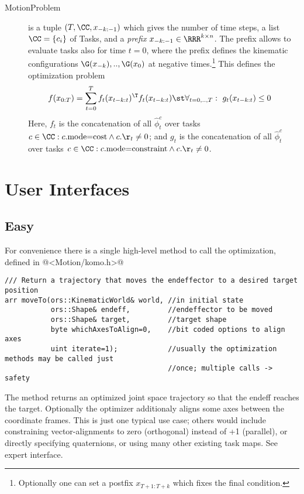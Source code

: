\documentclass[10pt,fleqn,twoside]{article}
\begin{document}
\begin{description}
\item[MotionProblem] is a tuple $(T,\CC,x_{-k:-1})$ which gives
the number of time steps, a list $\CC=\{c_i\}$ of Tasks, and
a \emph{prefix} $x_{-k:-1} \in\RRR^{k\times n}$. The prefix allows to
evaluate tasks also for time $t=0$, where the prefix defines the
kinematic configurations $\G(x_{-k}),..,\G(x_0)$ at negative
times.\footnote{Optionally one can set a postfix $x_{T+1:T+k}$ which
fixes the final condition.} This defines the optimization problem
\begin{align}
f(x_{0:T})
&= \sum_{t=0}^T f_t(x_{t-k:t})^\T f_t(x_{t-k:t})
   \st \forall_{t=0,..,T}:~ g_t(x_{t-k:t}) \le 0
\end{align}
Here, $f_t$ is the concatenation of all $\hat\phi_t^c$ over tasks
$c\in\CC:c.\text{mode=cost} \wedge c.\r_t\not=0$; and $g_t$ is the
concatenation of all $\hat\phi_t^c$ over tasks
$c\in\CC:c.\text{mode=constraint} \wedge c.\r_t\not=0$.

\end{description}




\section{User Interfaces}

\subsection{Easy}

For convenience there is a single high-level method to call the
optimization, defined in @<Motion/komo.h>@
\begin{code}
\begin{verbatim}
/// Return a trajectory that moves the endeffector to a desired target position
arr moveTo(ors::KinematicWorld& world, //in initial state
           ors::Shape& endeff,         //endeffector to be moved
           ors::Shape& target,         //target shape
           byte whichAxesToAlign=0,    //bit coded options to align axes
           uint iterate=1);            //usually the optimization methods may be called just
                                       //once; multiple calls -> safety
\end{verbatim}
\end{code}
The method returns an optimized joint space trajectory so that the
endeff reaches the target. Optionally the optimizer additionaly
aligns some axes between the coordinate frames. This is just one
typical use case; others would include constraining vector-alignments
to zero (orthogonal) instead of +1 (parallel), or directly specifying
quaternions, or using many other existing task maps. See expert
interface.
\end{document}
